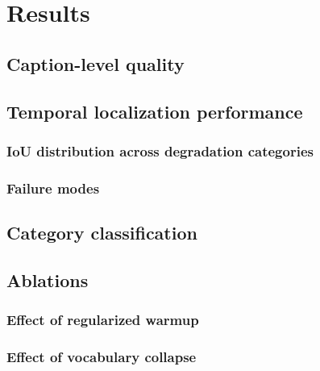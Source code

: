 \chapter{Results} \label{ch:results}

\section{Caption-level quality} \label{sec:results-caption}

\section{Temporal localization performance} \label{sec:results-temporal}
\subsection{IoU distribution across degradation categories}
\subsection{Failure modes}

\section{Category classification} \label{sec:results-categories}

\section{Ablations} \label{sec:results-ablations}
\subsection{Effect of regularized warmup}
\subsection{Effect of vocabulary collapse}
